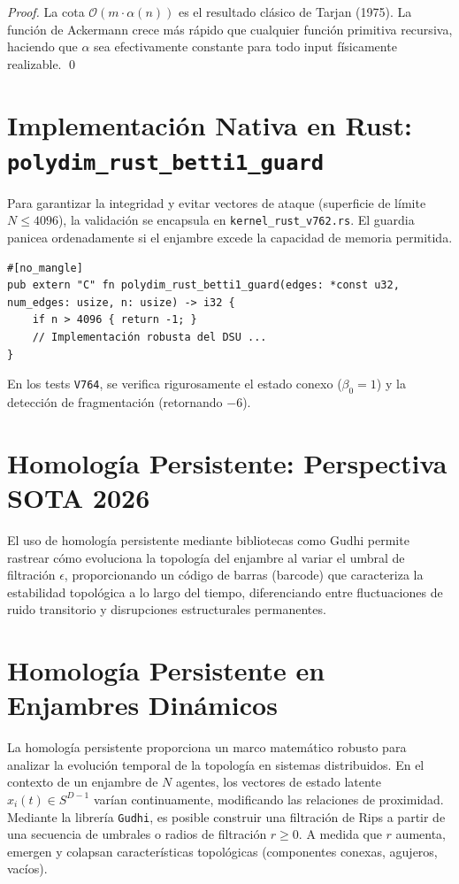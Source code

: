 \begin{proof}
La cota $\mathcal{O}(m \cdot \alpha(n))$ es el resultado clásico de 
Tarjan (1975). La función de Ackermann crece más rápido que cualquier
función primitiva recursiva, haciendo que $\alpha$ sea efectivamente
constante para todo input físicamente realizable. \qed
\end{proof}

\section{Implementación Nativa en Rust: \texttt{polydim\_rust\_betti1\_guard}}
Para garantizar la integridad y evitar vectores de ataque (superficie de límite $N \le 4096$), la validación se encapsula en \texttt{kernel\_rust\_v762.rs}. El guardia panicea ordenadamente si el enjambre excede la capacidad de memoria permitida.

\begin{verbatim}
#[no_mangle]
pub extern "C" fn polydim_rust_betti1_guard(edges: *const u32, num_edges: usize, n: usize) -> i32 {
    if n > 4096 { return -1; }
    // Implementación robusta del DSU ...
}
\end{verbatim}
En los tests \texttt{V764}, se verifica rigurosamente el estado conexo ($\beta_0=1$) y la detección de fragmentación (retornando $-6$).

\section{Homología Persistente: Perspectiva SOTA 2026}
El uso de homología persistente mediante bibliotecas como Gudhi permite rastrear cómo evoluciona la topología del enjambre al variar el umbral de filtración $\epsilon$, proporcionando un código de barras (barcode) que caracteriza la estabilidad topológica a lo largo del tiempo, diferenciando entre fluctuaciones de ruido transitorio y disrupciones estructurales permanentes.

\section{Homología Persistente en Enjambres Dinámicos}

La homología persistente proporciona un marco matemático robusto para analizar la evolución temporal de la topología en sistemas distribuidos. En el contexto de un enjambre de $N$ agentes, los vectores de estado latente $x_i(t) \in S^{D-1}$ varían continuamente, modificando las relaciones de proximidad. Mediante la librería \texttt{Gudhi}, es posible construir una filtración de Rips a partir de una secuencia de umbrales o radios de filtración $r \ge 0$. A medida que $r$ aumenta, emergen y colapsan características topológicas (componentes conexas, agujeros, vacíos). 

